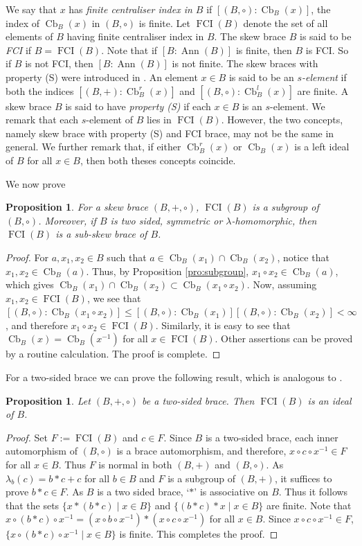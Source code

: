 \documentclass[oneside]{amsart}
\numberwithin{equation}{section}
\theoremstyle{plain}
\newtheorem{pro}[equation]{Proposition}
\theoremstyle{definition}
\newcommand{\Cb}{\operatorname{Cb} }
\newcommand{\Ann}{\operatorname{Ann} }
\newcommand{\FCI}{\operatorname{FCI}}
\begin{document}
We say that $x$ has \emph{finite centraliser index in $B$}  if  $[(B, \circ) : \Cb_B(x)]$, the  index  of  $\Cb_B(x)$ in $(B, \circ)$ is finite.  Let $\FCI(B)$ denote the set of all elements of  $B$ having finite centraliser index in $B$. The skew brace $B$ is said to be \emph{FCI} if $B = \FCI(B)$. Note that if $[B: \Ann(B)]$ is finite, then $B$ is FCI. So if $B$ is not FCI, then $[B:\Ann(B)]$ is not finite. The skew braces with property (S) were introduced in \cite[Definition 3.7]{CFT25}. An element $x \in B$ is said to be an \emph{$s$-element} if both the indices $[(B, +) : \Cb^r_B(x)]$ and $[(B, \circ) : \Cb^l_B(x)]$ are finite.
A skew brace $B$ is said to have \emph{property (S)} if  each $x \in B$ is an $s$-element. We remark that each $s$-element of $B$ lies in $\FCI(B)$.  However, the two concepts, namely skew brace with property (S) and FCI brace, may not be the same in general. We further remark that, if either  $\Cb^r_B(x)$ or $\Cb_B(x)$  is a left ideal of $B$ for all $x \in B$, then both theses concepts coincide. 

We now prove
\begin{pro}
   For a skew brace $(B,+, \circ)$,  $\FCI(B)$ is a subgroup of $(B,\circ)$. Moreover, if $B$ is two sided, symmetric or $\lambda$-homomorphic, then $\FCI(B)$ is a sub-skew brace of $B$.
\end{pro}
\begin{proof}
 For $a, x_1, x_2 \in B$ such that  $a \in \Cb_B(x_1)\cap\Cb_B(x_2)$, notice that $x_1, x_2 \in \Cb_B(a)$. Thus, by Proposition  \ref{pro:subgroup}, $x_1 \circ x_2 \in  \Cb_B(a)$, which gives   $\Cb_B(x_1) \cap \Cb_B(x_2) \subset \Cb_B(x_1\circ x_2)$. Now, assuming $x_1, x_2 \in \FCI(B)$, we see that  $[(B,\circ) : \Cb_B(x_1\circ x_2)] \leqslant [(B,\circ) : \Cb_B(x_1)][(B,\circ):\Cb_B(x_2)]<\infty$, and therefore  $x_1 \circ x_2 \in \FCI(B)$. Similarly, it is easy to see that  $\Cb_B(x) = \Cb_B(x^{-1})$ for all $x \in \FCI(B)$.  Other assertions can be proved by a routine calculation. The proof is complete.
\end{proof}

For a two-sided brace we can prove the following result, which is analogous to \cite[Proposition 3.10]{CFT25}.  
 \begin{pro}
  Let $(B,+, \circ)$ be a two-sided brace. Then $\FCI(B)$ is an ideal of $B$.
\end{pro}
\begin{proof}
    Set $F:= \FCI(B)$ and  $c \in F$.  Since $B$ is a two-sided brace, each inner automorphism of $(B,\circ)$ is a brace automorphism, and therefore,  $x \circ c \circ x^{-1} \in F$ for all $x \in B$. Thus $F$ is normal in both $(B, +)$ and $(B, \circ)$.  As $\lambda_b(c)=b\ast c+c$ for all $b \in B$ and $F$ is a subgroup of $(B,+)$, it suffices to prove $b\ast c \in F$.  As $B$ is a two sided brace, `$\ast$' is associative on $B$. Thus it follows that the sets $\{x \ast( b\ast c) \mid x \in B\}$ and $\{(b \ast c) \ast x \mid x \in B\}$ are finite. Note that $x\circ(b\ast c)\circ x^{-1} = (x\circ b\circ x^{-1})\ast ( x\circ c\circ x^{-1})$ for all $x \in B$. Since $x\circ c\circ x^{-1}\in F$, $\{x\circ(b\ast c)\circ x^{-1} \mid x\in B\}$ is finite. This completes the proof.
 \end{proof}
\end{document}

